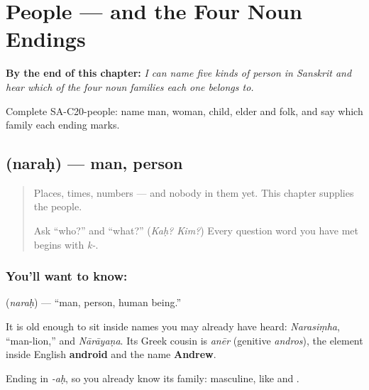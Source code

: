 
\chapter{People --- and the Four Noun Endings}
\label{ch:sa-people}

\begin{chapteropening}
\textbf{By the end of this chapter:} \emph{I can name five kinds of person in Sanskrit and hear which of the four noun families each one belongs to.}

Complete SA-C20-people: name man, woman, child, elder and folk, and say which family each ending marks.
\end{chapteropening}

\section[\texorpdfstring{\sk{नरः} (naraḥ)}{नरः (naraḥ)}]{ (naraḥ) — man, person}

\label{lesson:SA-C20-man}



\begin{quote}
Places, times, numbers — and nobody in them yet. This chapter supplies the people.

Ask \textquotedblleft{}who?\textquotedblright{} and \textquotedblleft{}what?\textquotedblright{} (\emph{Kaḥ? Kim?}) Every question word you have met begins with \emph{k-}.
\end{quote}

\subsection*{You'll want to know: }
\textbf{} (\emph{naraḥ}) — \textquotedblleft{}man, person, human being.\textquotedblright{}

It is old enough to sit inside names you may already have heard: \emph{Narasiṃha}, \textquotedblleft{}man-lion,\textquotedblright{} and \emph{Nārāyaṇa}. Its Greek cousin is \emph{anēr} (genitive \emph{andros}), the element inside English \textbf{android} and the name \textbf{Andrew}.

Ending in \emph{-aḥ}, so you already know its family: masculine, like  and .

